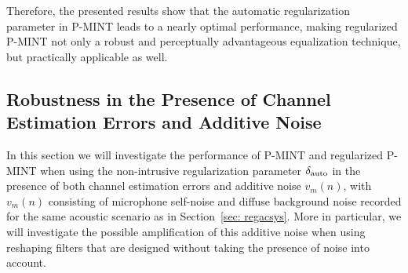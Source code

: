 \documentclass[10pt]{IEEEtran}
\begin{document}
Therefore, the presented results show that the automatic regularization parameter in P-MINT leads to a nearly optimal performance, making regularized P-MINT not only a robust and perceptually advantageous equalization technique, but practically applicable as well.

\subsection{Robustness in the Presence of Channel Estimation Errors and Additive Noise}
\label{sec: noise}
In this section we will investigate the performance of P-MINT and regularized P-MINT when using the non-intrusive regularization parameter $\delta_{\rm auto}$ in the presence of both channel estimation errors and additive noise $v_m(n)$, with $v_m(n)$ consisting of microphone self-noise and diffuse background noise recorded for the same acoustic scenario as in Section~\ref{sec: regacsys}.
More in particular, we will investigate the possible amplification of this additive noise when using reshaping filters that are designed without taking the presence of noise into account.
\end{document}
